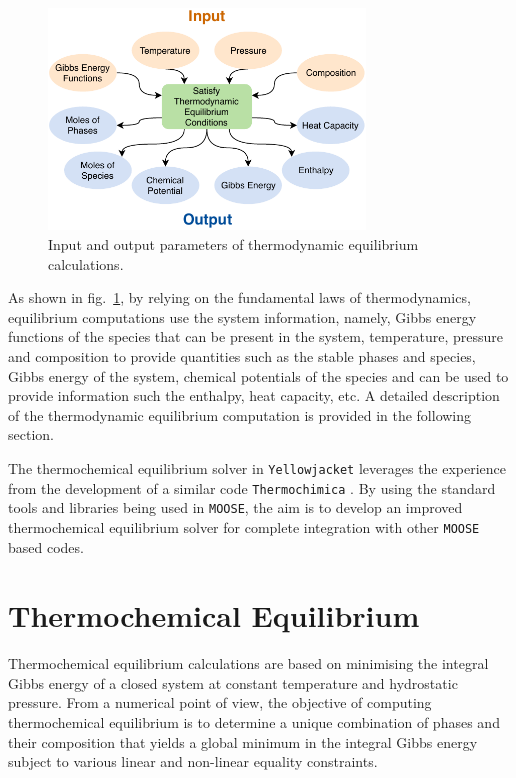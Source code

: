     \begin{figure}
        \centering
        \includegraphics[width=0.75\textwidth]{figures/Thermodynamics.pdf}
        \caption{Input and output parameters of thermodynamic equilibrium calculations.}
        \label{fig:Thermod}
    \end{figure}
    
    As shown in fig.~\ref{fig:Thermod}, by relying on the fundamental laws of thermodynamics, equilibrium computations use the system information, namely, Gibbs energy functions of the species that can be present in the system, temperature, pressure and composition to provide quantities such as the stable phases and species, Gibbs energy of the system, chemical potentials of the species and can be used to provide information such the enthalpy, heat capacity, etc. A detailed description of the thermodynamic equilibrium computation is provided in the following section.
    
    The thermochemical equilibrium solver in \texttt{Yellowjacket} leverages the experience from the development of a similar code \texttt{Thermochimica} \cite{PIRO2013266}. By using the standard tools and libraries being used in \texttt{MOOSE}, the aim is to develop an improved thermochemical equilibrium solver for complete integration with other \texttt{MOOSE} based codes.
    
\section*{Thermochemical Equilibrium}
    Thermochemical equilibrium calculations are based on minimising the integral Gibbs energy of a closed system at constant temperature and hydrostatic pressure. From a numerical point of view, the objective of computing thermochemical equilibrium is to determine a unique combination of phases and their composition that yields a global minimum in the integral Gibbs energy subject to various linear and non-linear equality constraints.
